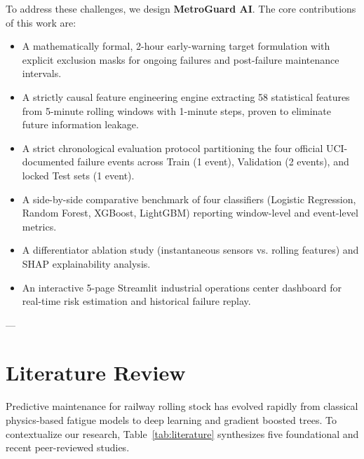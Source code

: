 \documentclass[10pt,twocolumn,a4paper]{article}
\begin{document}
To address these challenges, we design \textbf{MetroGuard AI}. The core contributions of this work are:
\begin{itemize}
    \item A mathematically formal, 2-hour early-warning target formulation with explicit exclusion masks for ongoing failures and post-failure maintenance intervals.
    \item A strictly causal feature engineering engine extracting 58 statistical features from 5-minute rolling windows with 1-minute steps, proven to eliminate future information leakage.
    \item A strict chronological evaluation protocol partitioning the four official UCI-documented failure events across Train (1 event), Validation (2 events), and locked Test sets (1 event).
    \item A side-by-side comparative benchmark of four classifiers (Logistic Regression, Random Forest, XGBoost, LightGBM) reporting window-level and event-level metrics.
    \item A differentiator ablation study (instantaneous sensors vs. rolling features) and SHAP explainability analysis.
    \item An interactive 5-page Streamlit industrial operations center dashboard for real-time risk estimation and historical failure replay.
\end{itemize}

---

\section{Literature Review}
Predictive maintenance for railway rolling stock has evolved rapidly from classical physics-based fatigue models to deep learning and gradient boosted trees. To contextualize our research, Table~\ref{tab:literature} synthesizes five foundational and recent peer-reviewed studies.
\end{document}
